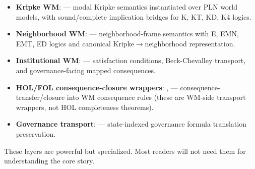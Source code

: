 \documentclass[11pt,openany]{report}
\begin{document}
\begin{itemize}
\item \textbf{Kripke WM}: ---
  modal Kripke semantics instantiated over PLN world models, with sound/complete
  implication bridges for K, KT, KD, K4 logics.

\item \textbf{Neighborhood WM}: ---
  neighborhood-frame semantics with E, EMN, EMT, ED logics and canonical
  Kripke$\to$neighborhood representation.

\item \textbf{Institutional WM}: ---
  satisfaction conditions, Beck-Chevalley transport, and governance-facing
  mapped consequences.

\item \textbf{HOL/FOL consequence-closure wrappers}: ,
  ---
  consequence-transfer/closure into WM consequence rules (these are WM-side
  transport wrappers, not HOL completeness theorems).

\item \textbf{Governance transport}: ---
  state-indexed governance formula translation preservation.
\end{itemize}

These layers are powerful but specialized.  Most readers will not need them
for understanding the core \xiPLN{} story.




\end{document}
